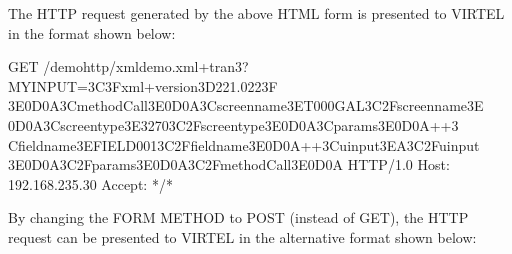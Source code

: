 \documentclass[letterpaper,10pt,english]{sphinxmanual}
\begin{document}

The HTTP request generated by the above HTML form is presented to VIRTEL in the format shown below:

\begin{sphinxVerbatim}[commandchars=\\\{\}]
GET /demohttp/xmldemo.xml+tran3?MYINPUT=\PYGZpc{}3C\PYGZpc{}3Fxml+version\PYGZpc{}3D\PYGZpc{}221.0\PYGZpc{}22\PYGZpc{}3F\PYGZpc{}
3E\PYGZpc{}0D\PYGZpc{}0A\PYGZpc{}3CmethodCall\PYGZpc{}3E\PYGZpc{}0D\PYGZpc{}0A\PYGZpc{}3Cscreenname\PYGZpc{}3ET000\PYGZhy{}GAL\PYGZpc{}3C\PYGZpc{}2Fscreenname\PYGZpc{}3E
\PYGZpc{}0D\PYGZpc{}0A\PYGZpc{}3Cscreentype\PYGZpc{}3E3270\PYGZpc{}3C\PYGZpc{}2Fscreentype\PYGZpc{}3E\PYGZpc{}0D\PYGZpc{}0A\PYGZpc{}3Cparams\PYGZpc{}3E\PYGZpc{}0D\PYGZpc{}0A++\PYGZpc{}3
Cfieldname\PYGZpc{}3EFIELD001\PYGZpc{}3C\PYGZpc{}2Ffieldname\PYGZpc{}3E\PYGZpc{}0D\PYGZpc{}0A++\PYGZpc{}3Cuinput\PYGZpc{}3EA\PYGZpc{}3C\PYGZpc{}2Fuinput\PYGZpc{}
3E\PYGZpc{}0D\PYGZpc{}0A\PYGZpc{}3C\PYGZpc{}2Fparams\PYGZpc{}3E\PYGZpc{}0D\PYGZpc{}0A\PYGZpc{}3C\PYGZpc{}2FmethodCall\PYGZpc{}3E\PYGZpc{}0D\PYGZpc{}0A HTTP/1.0
Host: 192.168.235.30
Accept: */*
\end{sphinxVerbatim}


By changing the FORM METHOD to POST (instead of GET), the HTTP request can be presented to VIRTEL in the alternative format shown below:
\end{document}
